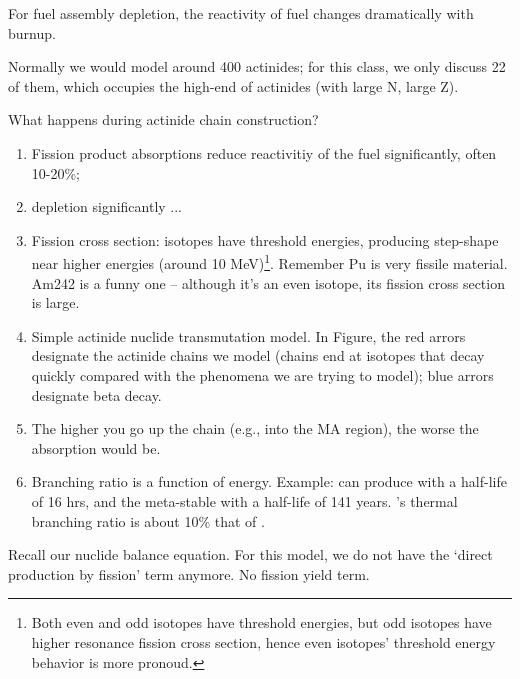 \documentclass{school-22.211-notes}
\date{April 11, 2012}
\begin{document}
\maketitle

 \label{fuel-depletion}
For fuel assembly depletion, the reactivity of fuel changes dramatically with burnup. 

Normally we would model around 400 actinides; for this class, we only discuss 22 of them, which occupies the high-end of actinides (with large N, large Z). 

What happens during actinide chain construction? 
\begin{enumerate}
\item Fission product absorptions reduce reactivitiy of the fuel significantly, often 10-20\%;
\item {} depletion significantly ...

\item Fission cross section: isotopes have threshold energies, producing step-shape near higher energies (around 10 MeV)\footnote{Both even and odd isotopes have threshold energies, but odd isotopes have higher resonance fission cross section, hence even isotopes' threshold energy behavior is more pronoud.}. Remember Pu is very fissile material. Am242 is a funny one -- although it's an even isotope, its fission cross section is large. 

\item Simple actinide nuclide transmutation model. In Figure, the red arrors designate the actinide chains we model (chains end at isotopes that decay quickly compared with the phenomena we are trying to model); blue arrors designate beta decay. 

\item The higher you go up the chain (e.g., into the MA region), the worse the absorption would be. 

\item Branching ratio is a function of energy. Example:  can produce  with a half-life of 16 hrs, and the meta-stable  with a half-life of 141 years. 's thermal branching ratio is about 10\% that of . 
\end{enumerate}


\clearpage
{}
Recall our nuclide balance equation. For this model, we do not have the `direct production by fission' term anymore.  No fission yield term. 
\end{document}
